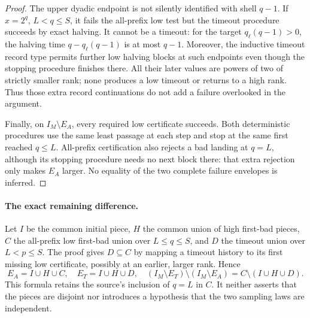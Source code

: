 \begin{proof}
The upper dyadic endpoint is not silently identified with shell \(q-1\).
If \(x=2^q\), \(L<q\le S\), it fails the all-prefix low test but the
timeout procedure succeeds by exact halving. It cannot be a timeout:
for the target \(q_\ell(q-1)>0\), the halving time
\(q-q_\ell(q-1)\) is at most \(q-1\).
Moreover, the inductive timeout record type permits further low halving
blocks at such endpoints even though the stopping procedure finishes
there. All their later values are powers of two of strictly smaller rank;
none produces a low timeout or returns to a high rank. Thus those extra
record continuations do not add a failure overlooked in the argument.

Finally, on \(I_M\setminus E_A\), every required low certificate succeeds.
Both deterministic procedures use the same least passage at each step
and stop at the same first reached \(q\le L\). All-prefix certification
also rejects a bad landing at \(q=L\), although its stopping procedure
needs no next block there: that extra rejection only makes \(E_A\) larger.
No equality of the two complete failure envelopes is inferred.
\end{proof}

\paragraph{The exact remaining difference.}
Let \(I\) be the common initial piece, \(H\) the common union of high
first-bad pieces, \(C\) the all-prefix low first-bad union over
\(L\le q\le S\), and \(D\) the timeout union over \(L<p\le S\).
The proof gives \(D\subseteq C\) by mapping a timeout history to its first
missing low certificate, possibly at an earlier, larger rank. Hence
\begin{equation}\label{eq:Shaik-timeout-certificate-defect}
 E_A=I\cup H\cup C,\quad E_T=I\cup H\cup D,\quad
 (I_M\setminus E_T)\setminus(I_M\setminus E_A)
       =C\setminus(I\cup H\cup D).
\end{equation}
This formula retains the source's inclusion of \(q=L\) in \(C\).
It neither asserts that the pieces are disjoint nor introduces a
hypothesis that the two sampling laws are independent.

